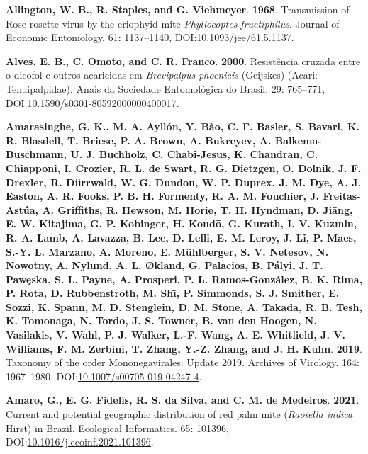 \documentclass[12pt,final,CPage]{ufthesis}
\newlength{\cslhangindent}
\newenvironment{CSLReferences}[2] %
{%
	\setlength{\parindent}{0pt}
	\ifodd #1 \everypar{\setlength{\hangindent}{\cslhangindent}}\ignorespaces\fi
	\ifnum #2 > 0
	\setlength{\parskip}{#2\baselineskip}
	\fi
}%
{}
\begin{document}
{\begin{CSLReferences}{1}{0}
  \leavevmode{}%
  \textbf{Allington, W. B., R. Staples, and G. Viehmeyer}. \textbf{1968}. Transmission of {Rose rosette virus} by the eriophyid mite {\emph{Phyllocoptes fructiphilus}}. Journal of Economic Entomology. 61: 1137--1140, DOI:\href{https://doi.org/10.1093/jee/61.5.1137}{10.1093/jee/61.5.1137}.

  \leavevmode{}%
  \textbf{Alves, E. B., C. Omoto, and C. R. Franco}. \textbf{2000}. Resist{ê}ncia cruzada entre o dicofol e outros acaricidas em {\emph{Brevipalpus phoenicis}} ({Geijskes}) ({Acari}: {Tenuipalpidae}). Anais da Sociedade Entomol{ó}gica do Brasil. 29: 765--771, DOI:\href{https://doi.org/10.1590/s0301-80592000000400017}{10.1590/s0301-80592000000400017}.

  \leavevmode{}%
  \textbf{Amarasinghe, G. K., M. A. Ayllón, Y. Bào, C. F. Basler, S. Bavari, K. R. Blasdell, T. Briese, P. A. Brown, A. Bukreyev, A. Balkema-Buschmann, U. J. Buchholz, C. Chabi-Jesus, K. Chandran, C. Chiapponi, I. Crozier, R. L. de Swart, R. G. Dietzgen, O. Dolnik, J. F. Drexler, R. Dürrwald, W. G. Dundon, W. P. Duprex, J. M. Dye, A. J. Easton, A. R. Fooks, P. B. H. Formenty, R. A. M. Fouchier, J. Freitas-Astúa, A. Griffiths, R. Hewson, M. Horie, T. H. Hyndman, D. Jiāng, E. W. Kitajima, G. P. Kobinger, H. Kondō, G. Kurath, I. V. Kuzmin, R. A. Lamb, A. Lavazza, B. Lee, D. Lelli, E. M. Leroy, J. Lǐ, P. Maes, S.-Y. L. Marzano, A. Moreno, E. Mühlberger, S. V. Netesov, N. Nowotny, A. Nylund, A. L. Økland, G. Palacios, B. Pályi, J. T. Pawęska, S. L. Payne, A. Prosperi, P. L. Ramos-González, B. K. Rima, P. Rota, D. Rubbenstroth, M. Shı̄, P. Simmonds, S. J. Smither, E. Sozzi, K. Spann, M. D. Stenglein, D. M. Stone, A. Takada, R. B. Tesh, K. Tomonaga, N. Tordo, J. S. Towner, B. van den Hoogen, N. Vasilakis, V. Wahl, P. J. Walker, L.-F. Wang, A. E. Whitfield, J. V. Williams, F. M. Zerbini, T. Zhāng, Y.-Z. Zhang, and J. H. Kuhn}. \textbf{2019}. Taxonomy of the order {Mononegavirales}: Update 2019. Archives of Virology. 164: 1967--1980, DOI:\href{https://doi.org/10.1007/s00705-019-04247-4}{10.1007/s00705-019-04247-4}.

  \leavevmode{}%
  \textbf{Amaro, G., E. G. Fidelis, R. S. da Silva, and C. M. de Medeiros}. \textbf{2021}. Current and potential geographic distribution of red palm mite ({\emph{Raoiella indica}} {Hirst}) in {Brazil}. Ecological Informatics. 65: 101396, DOI:\href{https://doi.org/10.1016/j.ecoinf.2021.101396}{10.1016/j.ecoinf.2021.101396}.


\end{CSLReferences}}
\end{document}
